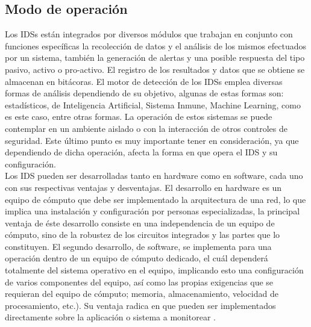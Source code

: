 \subsection{Modo de operación}

Los IDSs están integrados por diversos módulos que trabajan en conjunto con funciones específicas la recolección de datos y el análisis de los mismos efectuados por un sistema, también la generación de alertas y una posible respuesta del tipo pasivo, activo o pro-activo. El registro de los resultados y datos que se obtiene se almacenan en bitácoras. El motor de detección de los IDSs emplea diversas formas de análisis dependiendo de su objetivo, algunas de estas formas son: estadísticos, de Inteligencia Artificial, Sistema Inmune, Machine Learning, como es este caso, entre otras formas. La operación de estos sistemas se puede contemplar en un ambiente aislado o con la interacción de otros controles de seguridad. Este último punto es muy importante tener en consideración, ya que dependiendo de dicha operación, afecta la forma en que opera el IDS y su configuración. 
\\

Los IDS pueden ser desarrolladas tanto en hardware como en software, cada uno con sus respectivas ventajas y desventajas. El desarrollo en hardware es un equipo de cómputo que debe ser implementado la arquitectura de una red, lo que implica una instalación y configuración por personas especializadas, la principal ventaja de éste desarrollo consiste en una independencia de un equipo de cómputo, sino de la robustez de los circuitos integrados y las partes que lo constituyen. El segundo desarrollo, de software, se implementa para una operación dentro de un equipo de cómputo dedicado, el cuál dependerá totalmente del sistema operativo en el equipo, implicando esto una configuración de varios componentes del equipo, así como las propias exigencias que se requieran del equipo de cómputo; memoria, almacenamiento, velocidad de procesamiento, etc.). Su ventaja radica en que pueden ser implementados directamente sobre la aplicación o sistema a monitorear \cite{dieciseis}. \\